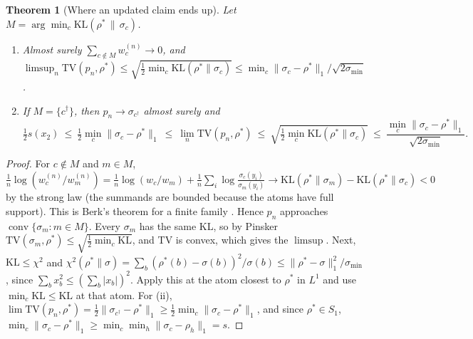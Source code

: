 \documentclass[11pt]{article}
\newtheorem{theorem}{Theorem}[section]
\theoremstyle{definition}
\theoremstyle{remark}
\begin{document}
\begin{theorem}[Where an updated claim ends up]\label{thm:claimlimit}
Let $M=\arg\min_c\mathrm{KL}(\rho^*\,\|\,\sigma_c)$.
\begin{enumerate}[label=(\roman*)]
  \item Almost surely $\sum_{c\notin M}w_c^{(n)}\to0$, and $\limsup_n\mathrm{TV}(p_n,\rho^*)\le\sqrt{\tfrac12\min_c\mathrm{KL}(\rho^*\|\sigma_c)}\le\min_c\|\sigma_c-\rho^*\|_1/\sqrt{2\sigma_{\min}}$.
  \item If $M=\{c^\dagger\}$, then $p_n\to\sigma_{c^\dagger}$ almost surely and
  \[\tfrac12 s(x_2)\ \le\ \tfrac12\min_c\|\sigma_c-\rho^*\|_1\ \le\ \lim_n\mathrm{TV}(p_n,\rho^*)\ \le\ \sqrt{\tfrac12\min_c\mathrm{KL}(\rho^*\|\sigma_c)}\ \le\ \frac{\min_c\|\sigma_c-\rho^*\|_1}{\sqrt{2\sigma_{\min}}}.\]
\end{enumerate}
\end{theorem}
\begin{proof}
For $c\notin M$ and $m\in M$, $\frac1n\log(w^{(n)}_c/w^{(n)}_m)=\frac1n\log(w_c/w_m)+\frac1n\sum_i\log\frac{\sigma_c(y_i)}{\sigma_m(y_i)}\to\mathrm{KL}(\rho^*\|\sigma_m)-\mathrm{KL}(\rho^*\|\sigma_c)<0$ by the strong law (the summands are bounded because the atoms have full support). This is Berk's theorem for a finite family \cite{berk66,kleijnvdv06}. Hence $p_n$ approaches $\operatorname{conv}\{\sigma_m:m\in M\}$. Every $\sigma_m$ has the same KL, so by Pinsker $\mathrm{TV}(\sigma_m,\rho^*)\le\sqrt{\frac12\min_c\mathrm{KL}}$, and TV is convex, which gives the $\limsup$. Next, $\mathrm{KL}\le\chi^2$ \cite{gibbssu02} and $\chi^2(\rho^*\|\sigma)=\sum_b(\rho^*(b)-\sigma(b))^2/\sigma(b)\le\|\rho^*-\sigma\|_1^2/\sigma_{\min}$, since $\sum_bx_b^2\le(\sum_b|x_b|)^2$. Apply this at the atom closest to $\rho^*$ in $L^1$ and use $\min_c\mathrm{KL}\le\mathrm{KL}$ at that atom. For (ii), $\lim\mathrm{TV}(p_n,\rho^*)=\frac12\|\sigma_{c^\dagger}-\rho^*\|_1\ge\frac12\min_c\|\sigma_c-\rho^*\|_1$, and since $\rho^*\in S_1$, $\min_c\|\sigma_c-\rho^*\|_1\ge\min_c\min_h\|\sigma_c-\rho_h\|_1=s$.
\end{proof}
\end{document}
